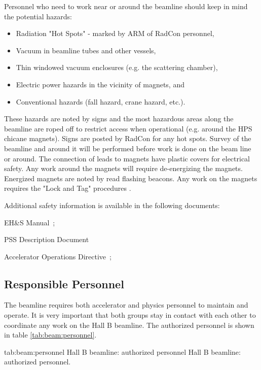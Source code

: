 Personnel who need to work near or around the beamline should keep in mind the potential hazards:
\begin{itemize}
\item Radiation "Hot Spots" - marked by ARM of RadCon personnel,
\item Vacuum in beamline tubes and other vessels,
\item Thin windowed vacuum enclosures (e.g. the scattering chamber),
\item Electric power hazards in the vicinity of magnets, and 
\item Conventional hazards (fall hazard, crane hazard, etc.). 
\end{itemize} 

These hazards are noted by signs and the most hazardous areas along the beamline are roped off to restrict access when operational (e.g. around the HPS chicane magnets). Signs are posted by RadCon for any hot spots. Survey of the beamline and around it will be performed before work is done on the beam line or around. The connection of leads to magnets have plastic covers for electrical safety. Any work around the magnets will require de-energizing the magnets. Energized magnets are noted by read flashing beacons. Any work on the magnets requires the "Lock and Tag" procedures \cite{EHScebaf}.  

\noindent{}Additional safety information is available in the following documents:
\begin{list}{--}{\setlength{\itemsep}{-0.15cm}}
  \item EH\&S Manual~\cite{EHScebaf};
  \item PSS Description Document~\cite{PSScebaf}
  \item Accelerator Operations Directive~\cite{AODcebaf};
\end{list}


\begin{safetyen}{10}{15}
\subsection{Responsible  Personnel} 
\end{safetyen}
The beamline requires both accelerator and physics personnel to maintain and operate. It is very important that both groups stay in contact with each other to coordinate any work on the Hall B beamline. The authorized personnel is shown in table \ref{tab:beam:personnel}.
\begin{namestab}{tab:beam:personnel}{ Hall B beamline: authorized personnel}{%
       Hall B beamline: authorized personnel.}
\end{namestab}
